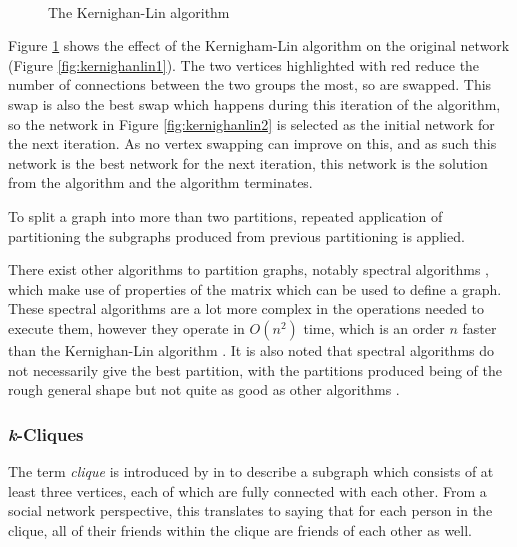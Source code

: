 \begin{figure}[htbp]
  \centering
  ~ 
  ~ 
  \caption{The Kernighan-Lin algorithm \cite{newman10}}
  \label{fig:kernighanlin}
\end{figure}

Figure \ref{fig:kernighanlin} shows the effect of the Kernigham-Lin algorithm on the original network (Figure \ref{fig:kernighanlin1}). The two vertices highlighted with red reduce the number of connections between the two groups the most, so are swapped. This swap is also the best swap which happens during this iteration of the algorithm, so the network in Figure \ref{fig:kernighanlin2} is selected as the initial network for the next iteration. As no vertex swapping can improve on this, and as such this network is the best network for the next iteration, this network is the solution from the algorithm and the algorithm terminates.

To split a graph into more than two partitions, repeated application of partitioning the subgraphs produced from previous partitioning is applied.

There exist other algorithms to partition graphs, notably spectral algorithms \cite{pothen90,fiedler73}, which make use of properties of the matrix which can be used to define a graph. These spectral algorithms are a lot more complex in the operations needed to execute them, however they operate in $O(n^2)$ time, which is an order $n$ faster than the Kernighan-Lin algorithm \cite{newman10}. It is also noted that spectral algorithms do not necessarily give the best partition, with the partitions produced being of the rough general shape but not quite as good as other algorithms \cite{newman10}.

\subsubsection{\emph{k}-Cliques}
The term \emph{clique} is introduced by \citeauthor{luce49} in \cite{luce49} to describe a subgraph which consists of at least three vertices, each of which are fully connected with each other. From a social network perspective, this translates to saying that for each person in the clique, all of their friends  within the clique are friends of each other as well.

